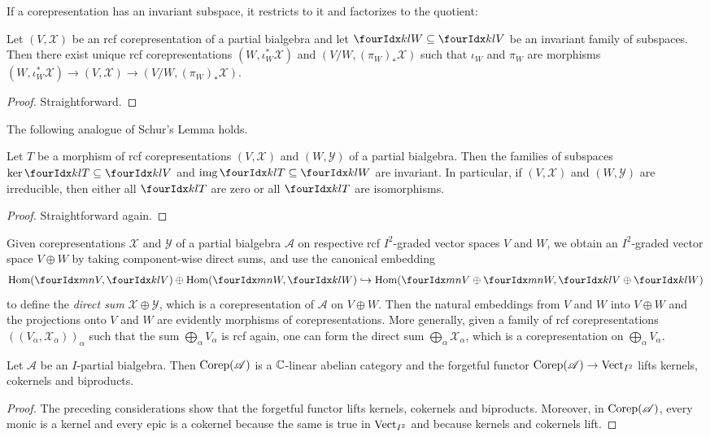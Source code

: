 If a corepresentation has an invariant subspace, it restricts to it
and factorizes to the quotient:
\begin{Lem}
  Let $(V,\mathscr{X})$ be an rcf corepresentation
  of a partial bialgebra and let $\Gru{W}{k}{l}
  \subseteq \Gru{V}{k}{l}$ be an invariant family of subspaces. Then
  there exist unique rcf corepresentations
  $(W,\iota_{W}^{*}\mathscr{X})$ and $(V/W,(\pi_{W})_{*}\mathscr{X})$ 
  such that $\iota_{W}$  and  $\pi_{W}$  are  morphisms
  $(W,\iota_{W}^{*}\mathscr{X}) \to (V,\mathscr{X}) \to (V/W,(\pi_{W})_{*}\mathscr{X})$.
\end{Lem}
\begin{proof}
  Straightforward.
\end{proof}
The following analogue of Schur's Lemma holds.
\begin{Lem} Let $T$ be a morphism of rcf
  corepresentations $(V,\mathscr{X})$ and $(W,\mathscr{Y})$ of a
  partial bialgebra. Then the families of subspaces $\ker
  \Gru{T}{k}{l} \subseteq \Gru{V}{k}{l}$ and $\img\Gru{T}{k}{l}
  \subseteq \Gru{W}{k}{l}$ are invariant.  In particular, if
  $(V,\mathscr{X})$ and $(W,\mathscr{Y})$ are irreducible, then either
  all $\Gru{T}{k}{l}$ are zero or all $\Gru{T}{k}{l}$ are
  isomorphisms.
\end{Lem} 
\begin{proof}
  Straightforward again.
\end{proof}


Given corepresentations $\mathscr{X}$ and $\mathscr{Y}$ of
a partial bialgebra $\mathscr{A}$ on respective rcf $I^{2}$-graded vector spaces $V$ and $W$,
we  obtain an $I^{2}$-graded vector space $V\oplus W$ by taking
component-wise direct sums, and use the canonical embedding 
\begin{align*}
  \Hom(\Gru{V}{m}{n},\Gru{V}{k}{l}) \oplus
  \Hom(\Gru{W}{m}{n},\Gru{W}{k}{l}) \hookrightarrow
  \Hom(\Gru{V}{m}{n} \oplus \Gru{W}{m}{n},\Gru{V}{k}{l} \oplus
  \Gru{W}{k}{l})
\end{align*}
to define the \emph{direct sum} $\mathscr{X} \oplus \mathscr{Y}$,
which is a corepresentation of $\mathscr{A}$ on $V\oplus W$. Then the
natural embeddings from $V$ and $W$ into $V\oplus W$ and the
projections onto $V$ and $W$ are evidently morphisms of
corepresentations.  More generally, given a family of rcf corepresentations
$((V_{\alpha},\mathscr{X}_{\alpha}))_{\alpha}$ such that the sum
$\bigoplus_{\alpha} V_{\alpha}$ is rcf again, one
can form the direct sum $\bigoplus_{\alpha} \mathscr{X}_{\alpha}$,
which is a corepresentation on $\bigoplus_{\alpha} V_{\alpha}$.
\begin{Prop}
  Let $\mathscr{A}$ be an $I$-partial bialgebra. Then $\mathrm{Corep}(\mathscr{A})$
  is a $\mathbb{C}$-linear abelian category and the forgetful functor
  $\mathrm{Corep}(\mathscr{A}) \to \mathrm{Vect}_{I^{2}}$ lifts kernels, cokernels and biproducts.
\end{Prop}
\begin{proof}
  The preceding considerations show that the forgetful functor lifts
  kernels, cokernels and biproducts. Moreover, in
  $\mathrm{Corep}(\mathscr{A})$, every monic is a kernel
  and every epic is a cokernel because the same is true in $\mathrm{Vect}_{I^{2}}$
  and because kernels and cokernels lift.
\end{proof}


